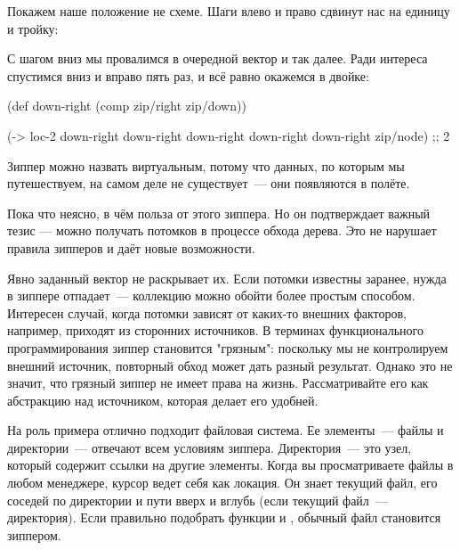 Покажем наше положение не схеме. Шаги влево и право сдвинут нас на единицу и
тройку:


\begin{figure}[ht!]
  \centering
  
\end{figure}


С шагом вниз мы провалимся в очередной вектор \code{[1 2 3]} и так далее. Ради
интереса спустимся вниз и вправо пять раз, и всё равно окажемся в двойке:

\begin{english}
  \begin{clojure}
(def down-right (comp zip/right zip/down))

(-> loc-2
    down-right
    down-right
    down-right
    down-right
    down-right
    zip/node)
;; 2
  \end{clojure}
\end{english}

Зиппер можно назвать виртуальным, потому что данных, по которым мы путешествуем,
на самом деле не существует~--- они появляются в полёте.

Пока что неясно, в чём польза от этого зиппера. Но он подтверждает важный тезис
— можно получать потомков в процессе обхода дерева. Это не нарушает правила
зипперов и даёт новые возможности.

Явно заданный вектор \code{[1 2 3]} не раскрывает их. Если потомки известны заранее,
нужда в зиппере отпадает~--- коллекцию можно обойти более простым
способом. Интересен случай, когда потомки зависят от каких-то внешних факторов,
например, приходят из сторонних источников. В терминах функционального
программирования зиппер становится "грязным": поскольку мы не контролируем
внешний источник, повторный обход может дать разный результат. Однако это не
значит, что грязный зиппер не имеет права на жизнь. Рассматривайте его как
абстракцию над источником, которая делает его удобней.

На роль примера отлично подходит файловая система. Ее элементы~--- файлы и
директории~--- отвечают всем условиям зиппера. Директория~--- это узел, который
содержит ссылки на другие элементы. Когда вы просматриваете файлы в любом
менеджере, курсор ведет себя как локация. Он знает текущий файл, его соседей по
директории и пути вверх и вглубь (если текущий файл~--- директория). Если
правильно подобрать функции  и , обычный файл становится
зиппером.

